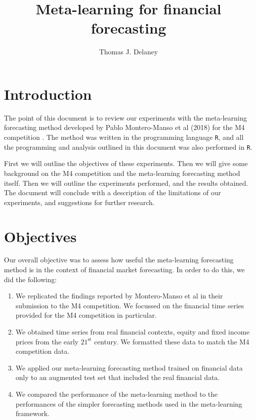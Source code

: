 \documentclass[a4paper,12pt]{article}
\title{Meta-learning for financial forecasting}
\date{}
\author{Thomas J. Delaney}
\theoremstyle{definition}
\begin{document}
\maketitle

\tableofcontents

\newpage

\section{Introduction}
The point of this document is to review our experiments with the meta-learning forecasting method developed by Pablo Montero-Manso et al (2018) \cite{montero} for the M4 competition \cite{m4}. The method was written in the programming language \texttt{R}, and all the programming and analysis outlined in this document was also performed in \texttt{R}.

First we will outline the objectives of these experiments. Then we will give some background on the M4 competition and the meta-learning forecasting method itself. Then we will outline the experiments performed, and the results obtained. The document will conclude with a description of the limitations of our experiments, and suggestions for further research.

\section{Objectives}\label{sec:objectives}
Our overall objective was to assess how useful the meta-learning forecasting method is in the context of financial market forecasting. In order to do this, we did the following:
\begin{enumerate}
	\item We replicated the findings reported by Montero-Manso et al in their submission to the M4 competition. We focussed on the financial time series provided for the M4 competition in particular.
	\item We obtained time series from real financial contexts, equity and fixed income prices from the early $21^{\text{st}}$ century. We formatted these data to match the M4 competition data.
	\item We applied our meta-learning forecasting method trained on financial data only to an augmented test set that included the real financial data.
	\item We compared the performance of the meta-learning method to the performances of the simpler forecasting methods used in the meta-learning framework.
\end{enumerate}
\end{document}
